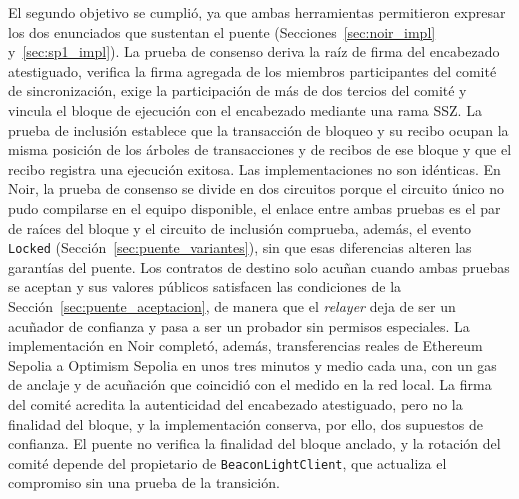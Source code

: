 El segundo objetivo se cumplió, ya que ambas herramientas permitieron expresar los dos enunciados
que sustentan el puente (Secciones~\ref{sec:noir_impl} y~\ref{sec:sp1_impl}). La prueba de
consenso deriva la raíz de firma del encabezado atestiguado, verifica la firma agregada de los
miembros participantes del comité de sincronización, exige la participación de más de dos tercios
del comité y vincula el bloque de ejecución con el encabezado mediante una rama SSZ. La prueba de
inclusión establece que la transacción de bloqueo y su recibo ocupan la misma posición de los
árboles de transacciones y de recibos de ese bloque y que el recibo registra una ejecución
exitosa. Las implementaciones no son idénticas. En Noir, la prueba de consenso se divide en dos
circuitos porque el circuito único no pudo compilarse en el equipo disponible, el enlace entre
ambas pruebas es el par de raíces del bloque y el circuito de inclusión comprueba, además, el
evento \texttt{Locked} (Sección~\ref{sec:puente_variantes}), sin que esas diferencias alteren las
garantías del puente. Los contratos de destino solo acuñan cuando ambas
pruebas se aceptan y sus valores públicos satisfacen las condiciones de la
Sección~\ref{sec:puente_aceptacion}, de manera que el \textit{relayer} deja de ser un acuñador de
confianza y pasa a ser un probador sin permisos especiales. La implementación en Noir completó,
además, transferencias reales de Ethereum Sepolia a Optimism Sepolia en unos tres minutos y medio
cada una, con un gas de anclaje y de acuñación que coincidió con el medido en la red local. La
firma del comité acredita la autenticidad del encabezado atestiguado, pero no la finalidad del
bloque, y la implementación conserva, por ello, dos supuestos de confianza. El puente no verifica
la finalidad del bloque anclado, y la rotación del comité depende del propietario de
\texttt{BeaconLightClient}, que actualiza el compromiso sin una prueba de la transición.


